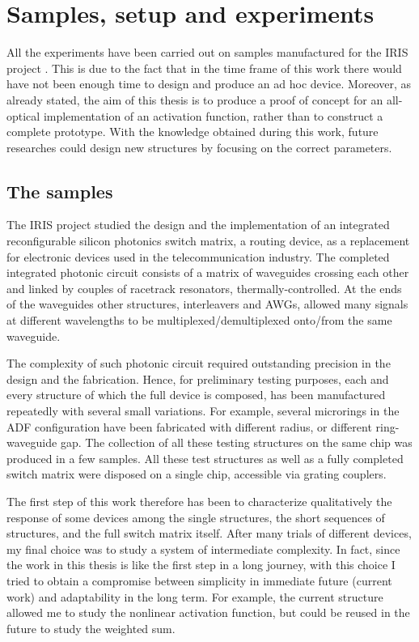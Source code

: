 \chapter{Samples, setup and experiments}
\label{ch:experiments}

All the experiments have been carried out on samples manufactured for the IRIS project \cite{testa2016design}.
This is due to the fact that in the time frame of this work there would have not been enough time to design and produce an ad hoc device.
Moreover, as already stated, the aim of this thesis is to produce a proof of concept for an all-optical implementation of an activation function, rather than to construct a complete prototype.
With the knowledge obtained during this work, future researches could design new structures by focusing on the correct parameters.

\section{The samples}
The IRIS project studied the design and the implementation of an integrated reconfigurable silicon photonics switch matrix, a routing device, as a replacement for electronic devices used in the telecommunication industry.
The completed integrated photonic circuit consists of a matrix of waveguides crossing each other and linked by couples of racetrack resonators, thermally-controlled.
At the ends of the waveguides other structures, interleavers and AWGs, allowed many signals at different wavelengths to be multiplexed/demultiplexed onto/from the same waveguide.

The complexity of such photonic circuit required outstanding precision in the design and the fabrication.
Hence, for preliminary testing purposes, each and every structure of which the full device is composed, has been manufactured repeatedly with several small variations.
For example, several microrings in the ADF configuration have been fabricated with different radius, or different ring-waveguide gap.
The collection of all these testing structures on the same chip was produced in a few samples.
All these test structures as well as a fully completed switch matrix were disposed on a single chip, accessible via grating couplers.

The first step of this work therefore has been to characterize qualitatively the response of some devices among the single structures, the short sequences of structures, and the full switch matrix itself.
After many trials of different devices, my final choice was to study a system of intermediate complexity.
In fact, since the work in this thesis is like the first step in a long journey, with this choice I tried to obtain a compromise between simplicity in immediate future (current work) and adaptability in the long term.
For example, the current structure allowed me to study the nonlinear activation function, but could be reused in the future to study the weighted sum.

